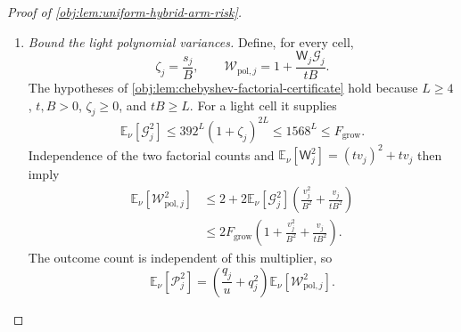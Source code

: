 \begin{proof}[Proof of \cref{obj:lem:uniform-hybrid-arm-risk}]
\begin{enumerate}
For \(s_j>0\), overlap implies
\[
\frac{v_j^2}{s_j}\le\frac{p_j}{\epsilon},
\qquad
q_j,v_j\le\frac{p_j}{\epsilon}.
\]
Indeed, \(\epsilon v_j\le s_j\), and multiplying by \(v_j\le p_j\) proves the first bound. The elementary inequalities
\[
0\le\frac{ts_j}{1+ts_j}\le1,
\qquad
ts_j\le(1+ts_j)^2
\]
give the four rational bounds
\[
\begin{aligned}
\frac{s_j(tv_j)^2}{(1+ts_j)^2}
&\le\frac{v_j^2}{s_j},&
\frac{s_jtv_j}{(1+ts_j)^2}
&\le v_j,\\
\frac{s_j^2tv_j}{(1+ts_j)^2}
&\le\frac{v_j}{t},&
\frac{s_j^2(tv_j)^2ts_j}{(1+ts_j)^4}
&\le\frac{v_j^2}{ts_j}.
\end{aligned}
\]
For example, the first, third, and fourth left-hand sides equal their respective right-hand sides multiplied by
\((ts_j/(1+ts_j))^2\), \((ts_j/(1+ts_j))^2\), and
\((ts_j/(1+ts_j))^4\). Hence \(q_j\le s_j\) gives
\[
q_j\frac{(tv_j)^2+tv_j}{(1+ts_j)^2}
\le\frac{v_j^2}{s_j}+v_j
\le\frac{2p_j}{\epsilon},
\]
\[
q_j^2\left\{
\frac{tv_j}{(1+ts_j)^2}
+\frac{(tv_j)^2ts_j}{(1+ts_j)^4}
\right\}
\le\frac{v_j}{t}+\frac{v_j^2}{ts_j}
\le\frac{2p_j}{t\epsilon}.
\]
Substitution into the variance identity proves
\[
\operatorname{Var}_\nu(\mathcal H_j)
\le C_{\mathrm{inv}}p_j
\left(\frac1{u\epsilon}+\frac1{t\epsilon}\right).
\]
For \(s_j=0\), both sides vanish by the null-cell identities already established. Summing over all cells gives
\[
\sum_{j=1}^d\operatorname{Var}_\nu(\mathcal H_j)
\le C_{\mathrm{inv}}
\left(\frac1{u\epsilon}+\frac1{t\epsilon}\right).
\]

\item \textit{Bound the light polynomial variances.}
Define, for every cell,
\[
\zeta_j=\frac{s_j}{B},
\qquad
\mathcal W_{\mathrm{pol},j}
=1+\frac{\mathsf W_j\mathcal G_j}{tB}.
\]
The hypotheses of \cref{obj:lem:chebyshev-factorial-certificate} hold because \(L\ge4\), \(t,B>0\), \(\zeta_j\ge0\), and \(tB\ge L\). For a light cell it supplies
\[
\mathbb E_\nu[\mathcal G_j^2]
\le392^L(1+\zeta_j)^{2L}
\le1568^L
\le F_{\mathrm{grow}}.
\]
Independence of the two factorial counts and
\(\mathbb E_\nu[\mathsf W_j^2]=(tv_j)^2+tv_j\) then imply
\[
\begin{aligned}
\mathbb E_\nu[\mathcal W_{\mathrm{pol},j}^2]
&\le
2+2\mathbb E_\nu[\mathcal G_j^2]
\left(\frac{v_j^2}{B^2}+\frac{v_j}{tB^2}\right)\\
&\le
2F_{\mathrm{grow}}
\left(1+\frac{v_j^2}{B^2}+\frac{v_j}{tB^2}\right).
\end{aligned}
\]
The outcome count is independent of this multiplier, so
\[
\mathbb E_\nu[\mathcal P_j^2]
=
\left(\frac{q_j}{u}+q_j^2\right)
\mathbb E_\nu[\mathcal W_{\mathrm{pol},j}^2].
\]


\end{enumerate}
\end{proof}
